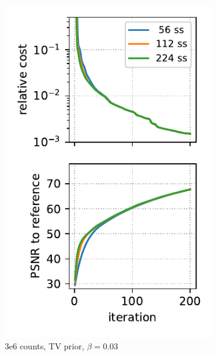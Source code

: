 \begin{figure}
\begin{subfigure}[b]{0.23\textwidth}
    \includegraphics[width=1.0\textwidth]{./figs/brain2d_counts_3.0E+06_seed_1_beta_3.0E-02_prior_TV_niter_ref_20000_fwhm_4.5_4.5_niter_200_ss.pdf}
    \caption{3e6 counts, TV prior, $\beta = 0.03$}
  \end{subfigure}
  \hfill
  \begin{subfigure}[b]{0.23\textwidth}
    \centering

\end{subfigure}
\end{figure}
